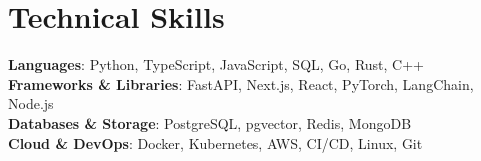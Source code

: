 \documentclass[letterpaper,11pt]{article}
\begin{document}
\section{Technical Skills}
 \begin{itemize}[leftmargin=0.15in, label={}]
    \small{\item{
     \textbf{Languages}{: Python, TypeScript, JavaScript, SQL, Go, Rust, C++} \\
     \textbf{Frameworks \& Libraries}{: FastAPI, Next.js, React, PyTorch, LangChain, Node.js} \\
     \textbf{Databases \& Storage}{: PostgreSQL, pgvector, Redis, MongoDB} \\
     \textbf{Cloud \& DevOps}{: Docker, Kubernetes, AWS, CI/CD, Linux, Git}
    }}
 \end{itemize}
\end{document}
